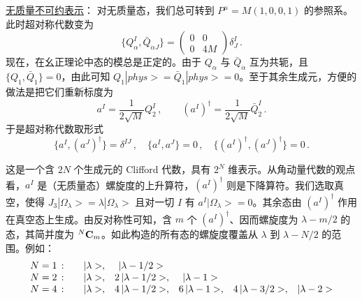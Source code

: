\noindent\underline{无质量不可约表示}：
\noindent 对无质量态，我们总可转到 $P^{\mu} = M (1,0,0,1)$ 的参照系。此时超对称代数变为
$$
\{ Q^{I}_{\alpha}, \bar{Q}_{\dot{\alpha}J} \} =
\left ( \begin{array}{lr}
0 & 0 \\ 0 & 4M \end{array} \right )
\delta^{I}_{J}\,.
$$
现在，在幺正理论中态的模总是正定的。由于 $Q_\alpha$ 与 $\bar Q_{\dot\alpha}$ 互为共轭，且 $\{ Q_{1}, \bar{Q}_{\dot{1}}\}=0$，由此可知
$Q_1|phys>= \bar{Q}_{\dot{1}}|phys> =0$。至于其余生成元，方便的做法是把它们重新标度为
$$
a^I=\frac{1}{2\sqrt{M}}Q^I_2\,,\qquad
(a^I)^\dagger=\frac{1}{2\sqrt{M}}\bar Q^I_{\dot 2}\,.
$$
于是超对称代数取形式
$$
\{ a^I, (a^J)^\dagger \} = \delta^{IJ}\,,\quad  \{ a^I, a^J \}=0\,,
\quad \{ (a^I)^\dagger, (a^J)^\dagger \} = 0\,.
$$


这是一个含 $2N$ 个生成元的 Clifford 代数，具有 $2^{N}$ 维表示。从角动量代数的观点看，$a^I$ 是（无质量态）螺旋度的上升算符，$(a^I)^\dagger$ 则是下降算符。我们选取真空，使得 $J_3|\Omega_\lambda>=\lambda 
|\Omega_\lambda>$ 且对一切 $I$ 有 $a^I|\Omega_\lambda>=0$。其余态由 $(a^I)^\dagger$ 作用在真空态上生成。由反对称性可知，含 $m$ 个
$(a^I)^\dagger$、因而螺旋度为 $\lambda -m/2$ 的态，其简并度为 $^N{\bf C}_m$。如此构造的所有态的螺旋度覆盖从 $\lambda$ 到 $\lambda-N/2$ 的范围。例如：
$$
\begin{array}{rrrrrr}
N = 1\,:& \quad |\lambda >,&    |\lambda-1/2>\hphantom{,}& & &\\
N = 2\,:& \quad |\lambda >,& 2\,|\lambda-1/2>,&|\lambda -1>\hphantom{,}&&\\ 
N = 4\,:& \quad |\lambda >,& 4\,|\lambda-1/2>,&
6\,|\lambda -1 >,&4\,|\lambda - 3/2>,& |\lambda -2 >
\end{array}
$$


